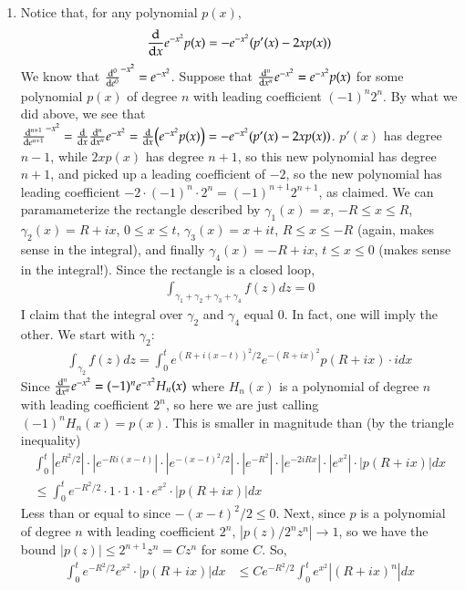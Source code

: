 \documentclass[12pt]{article}
\theoremstyle{definition}
\theoremstyle{remark}
\renewcommand{\leq}{\leqslant}
\begin{document}
\begin{enumerate}[leftmargin=\labelsep]
		\item Notice that, for any polynomial $p(x)$, 
		\begin{align*}
			\dv{x} e^{-x^2} p(x) = -e^{-x^2}(p'(x) - 2xp(x))
		\end{align*}
		We know that $\dv[0] e^{-x^2} = e^{-x^2}$. Suppose that $\dv[n]{x} e^{-x^2} = e^{-x^2}p(x)$ for some polynomial $p(x)$ of degree $n$ with leading coefficient $(-1)^n 2^n$. By what we did above, we see that $\dv[n+1] e^{-x^2} = \dv{x} \dv[n]{x} e^{-x^2} = \dv{x}(e^{-x^2}p(x)) =  -e^{-x^2}(p'(x) - 2xp(x))$. $p'(x)$ has degree $n-1$, while $2xp(x)$ has degree $n+1$, so this new polynomial has degree $n+1$, and picked up a leading coefficient of $-2$, so the new polynomial has leading coefficient $-2 \cdot (-1)^n \cdot 2^n = (-1)^{n+1} 2^{n+1}$, as claimed. We can paramameterize the rectangle described by $\gamma_1(x) = x$, $-R \leq x \leq R$, $\gamma_2(x) = R + ix$, $0 \leq x \leq t$, $\gamma_3(x) = x + it$, $R \leq x \leq -R$ (again, makes sense in the integral), and finally $\gamma_4(x) = -R + ix$, $t \leq x \leq 0$ (makes sense in the integral!). Since the rectangle is a closed loop,
		\begin{align*}
			\int_{\gamma_1+\gamma_2+\gamma_3+\gamma_4} f(z)dz = 0
		\end{align*}
		I claim that the integral over $\gamma_2$ and $\gamma_4$ equal 0. In fact, one will imply the other. We start with $\gamma_2$:
		\begin{align*}
			\int_{\gamma_2} f(z)dz = \int_0^t e^{(R+i(x-t))^2/2}e^{-(R+ix)^2}p(R+ix) \cdot idx
		\end{align*}
		Since $\dv[n]{x} e^{-x^2} = (-1)^n e^{-x^2} H_n(x)$ where $H_n(x)$ is a polynomial of degree $n$ with leading coefficient $2^n$, so here we are just calling $(-1)^nH_n(x) = p(x)$. This is smaller in magnitude than (by the triangle inequality)
		\begin{align*}
			\int_0^t |e^{R^2/2}| \cdot |e^{-Ri(x-t)}| \cdot |e^{-(x-t)^2/2}| \cdot |e^{-R^2}| \cdot |e^{-2iRx}| \cdot |e^{x^2}| \cdot |p(R+ix)|dx \\
			\leq \int_0^t e^{-R^2/2} \cdot 1 \cdot 1 \cdot 1 \cdot e^{x^2} \cdot |p(R+ix)|dx
		\end{align*}
		Less than or equal to since $-(x-t)^2/2 \leq 0$. Next, since $p$ is a polynomial of degree $n$ with leading coefficient $2^n$, $|p(z)/2^n z^n| \to 1$, so we have the bound $|p(z)| \leq 2^{n+1}z^n = Cz^n$ for some $C$. So,
		\begin{align*}
			\int_0^t e^{-R^2/2} e^{x^2} \cdot |p(R+ix)|dx &\leq Ce^{-R^2/2} \int_0^t e^{x^2} |(R+ix)^n|dx \\

\end{align*}
\end{enumerate}
\end{document}

